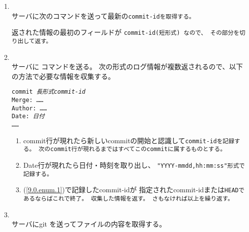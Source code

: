 \begin{enumerate}
  \item	{}\\
	サーバに次のコマンドを送って最新の\tt{commit-id}を取得する。
	\begin{narrow}
	\end{narrow}
	返された情報の最初のフィールドが \tt{commit-id(短形式)} なので、
	その部分を切り出して返す。
	
  \item	{}\\
	サーバに  コマンドを送る。
	次の形式のログ情報が複数返されるので、以下の方法で必要な情報を収集する。
	\begin{narrow}
		\tt{commit \it{長形式commit-id}}\\
		\tt{Merge: ……}\\
		\tt{Author: ……}\\
		\tt{Date: \it{日付}}\\
		\tt{……}
	\end{narrow}
	\begin{enumerate}
	  \item	\label{9.0.enum.1}%
		commit行が現れたら新しいcommitの開始と認識して\tt{commit-id}を記録する。
		次のcommit行が現れるまではすべてこのcommitに属するものとする。
	  \item	Date行が現れたら日付・時刻を取り出し、
		\tt{"YYYY-mmdd,hh:mm:ss"}形式で記録する。
	  \item	(\ref{9.0.enum.1})で記録したcommit-idが
		指定されたcommit-idまたは\tt{HEAD}であるならばこれで終了。
		収集した情報を返す。
		さもなければ以上を繰り返す。
	\end{enumerate}
	
  \item	{}\\
	サーバにgit  を送ってファイルの内容を取得する。
\end{enumerate}

